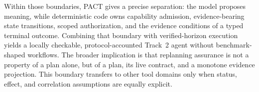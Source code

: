 \documentclass{article}
\begin{document}
Within those boundaries, PACT gives a precise separation: the model proposes
meaning, while deterministic code owns capability admission, evidence-bearing
state transitions, scoped authorization, and the evidence conditions of a
typed terminal outcome.  Combining that boundary with verified-horizon
execution yields a locally checkable, protocol-accounted Track~2 agent without
benchmark-shaped workflows.
The broader implication is that replanning assurance is not a property of a
plan alone, but of a plan, its live contract, and a monotone evidence
projection.  This boundary transfers to other tool domains only when status,
effect, and correlation assumptions are equally explicit.

\clearpage



\end{document}
